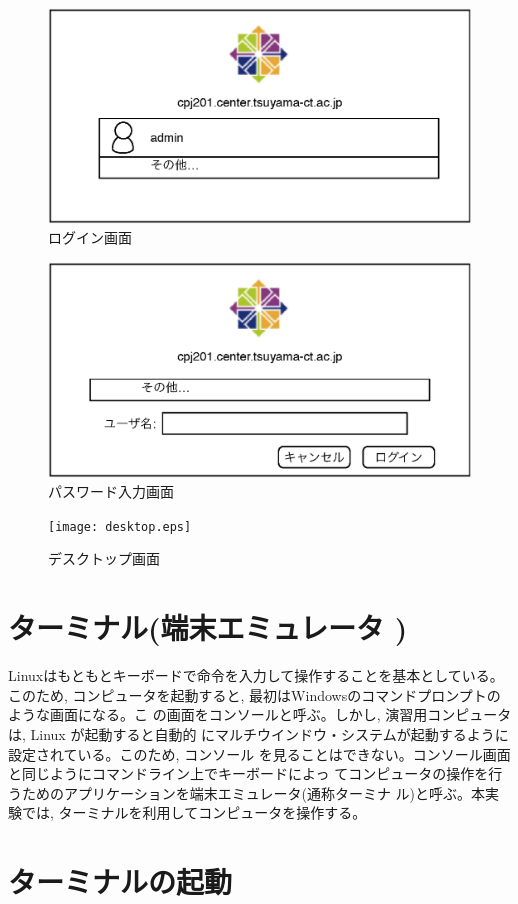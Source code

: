 \begin{figure}[htbp]
\begin{center}
\includegraphics[width=0.3\linewidth]{login.eps}
\caption{ログイン画面}
\label{fig:login}
\end{center}
\end{figure}

\begin{figure}[htbp]
\begin{center}
\includegraphics[width=0.3\linewidth]{passwd.eps}
\caption{パスワード入力画面}
\label{fig:passwd}
\end{center}
\end{figure}

\begin{figure}[htbp]
\begin{center}
\texttt{[image: desktop.eps]}
\caption{デスクトップ画面}
\label{fig:desktop}
\end{center}
\end{figure}

\section{ターミナル(端末エミュレータ )}

Linuxはもともとキーボードで命令を入力して操作することを基本としている。このため,
コンピュータを起動すると, 最初はWindowsのコマンドプロンプトのような画面になる。こ
の画面をコンソールと呼ぶ。しかし, 演習用コンピュータは, Linux が起動すると自動的
にマルチウインドウ・システムが起動するように設定されている。このため, コンソール
を見ることはできない。コンソール画面と同じようにコマンドライン上でキーボードによっ
てコンピュータの操作を行うためのアプリケーションを端末エミュレータ(通称ターミナ
ル)と呼ぶ。本実験では, ターミナルを利用してコンピュータを操作する。

\section{ターミナルの起動 }

